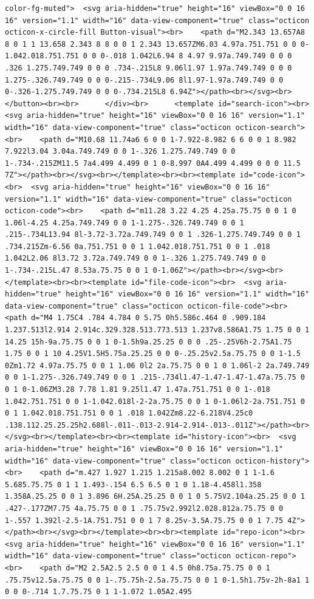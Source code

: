 \documentclass[
  letterpaper,
]{book}
\begin{document}
\begin{verbatim}
color-fg-muted">  <svg aria-hidden="true" height="16" viewBox="0 0 16 16" version="1.1" width="16" data-view-component="true" class="octicon octicon-x-circle-fill Button-visual"><br>    <path d="M2.343 13.657A8 8 0 1 1 13.658 2.343 8 8 0 0 1 2.343 13.657ZM6.03 4.97a.751.751 0 0 0-1.042.018.751.751 0 0 0-.018 1.042L6.94 8 4.97 9.97a.749.749 0 0 0 .326 1.275.749.749 0 0 0 .734-.215L8 9.06l1.97 1.97a.749.749 0 0 0 1.275-.326.749.749 0 0 0-.215-.734L9.06 8l1.97-1.97a.749.749 0 0 0-.326-1.275.749.749 0 0 0-.734.215L8 6.94Z"></path><br></svg><br></button><br><br>      </div><br>      <template id="search-icon"><br>  <svg aria-hidden="true" height="16" viewBox="0 0 16 16" version="1.1" width="16" data-view-component="true" class="octicon octicon-search"><br>    <path d="M10.68 11.74a6 6 0 0 1-7.922-8.982 6 6 0 0 1 8.982 7.922l3.04 3.04a.749.749 0 0 1-.326 1.275.749.749 0 0 1-.734-.215ZM11.5 7a4.499 4.499 0 1 0-8.997 0A4.499 4.499 0 0 0 11.5 7Z"></path><br></svg><br></template><br><br><template id="code-icon"><br>  <svg aria-hidden="true" height="16" viewBox="0 0 16 16" version="1.1" width="16" data-view-component="true" class="octicon octicon-code"><br>    <path d="m11.28 3.22 4.25 4.25a.75.75 0 0 1 0 1.06l-4.25 4.25a.749.749 0 0 1-1.275-.326.749.749 0 0 1 .215-.734L13.94 8l-3.72-3.72a.749.749 0 0 1 .326-1.275.749.749 0 0 1 .734.215Zm-6.56 0a.751.751 0 0 1 1.042.018.751.751 0 0 1 .018 1.042L2.06 8l3.72 3.72a.749.749 0 0 1-.326 1.275.749.749 0 0 1-.734-.215L.47 8.53a.75.75 0 0 1 0-1.06Z"></path><br></svg><br></template><br><br><template id="file-code-icon"><br>  <svg aria-hidden="true" height="16" viewBox="0 0 16 16" version="1.1" width="16" data-view-component="true" class="octicon octicon-file-code"><br>    <path d="M4 1.75C4 .784 4.784 0 5.75 0h5.586c.464 0 .909.184 1.237.513l2.914 2.914c.329.328.513.773.513 1.237v8.586A1.75 1.75 0 0 1 14.25 15h-9a.75.75 0 0 1 0-1.5h9a.25.25 0 0 0 .25-.25V6h-2.75A1.75 1.75 0 0 1 10 4.25V1.5H5.75a.25.25 0 0 0-.25.25v2.5a.75.75 0 0 1-1.5 0Zm1.72 4.97a.75.75 0 0 1 1.06 0l2 2a.75.75 0 0 1 0 1.06l-2 2a.749.749 0 0 1-1.275-.326.749.749 0 0 1 .215-.734l1.47-1.47-1.47-1.47a.75.75 0 0 1 0-1.06ZM3.28 7.78 1.81 9.25l1.47 1.47a.751.751 0 0 1-.018 1.042.751.751 0 0 1-1.042.018l-2-2a.75.75 0 0 1 0-1.06l2-2a.751.751 0 0 1 1.042.018.751.751 0 0 1 .018 1.042Zm8.22-6.218V4.25c0 .138.112.25.25.25h2.688l-.011-.013-2.914-2.914-.013-.011Z"></path><br></svg><br></template><br><br><template id="history-icon"><br>  <svg aria-hidden="true" height="16" viewBox="0 0 16 16" version="1.1" width="16" data-view-component="true" class="octicon octicon-history"><br>    <path d="m.427 1.927 1.215 1.215a8.002 8.002 0 1 1-1.6 5.685.75.75 0 1 1 1.493-.154 6.5 6.5 0 1 0 1.18-4.458l1.358 1.358A.25.25 0 0 1 3.896 6H.25A.25.25 0 0 1 0 5.75V2.104a.25.25 0 0 1 .427-.177ZM7.75 4a.75.75 0 0 1 .75.75v2.992l2.028.812a.75.75 0 0 1-.557 1.392l-2.5-1A.751.751 0 0 1 7 8.25v-3.5A.75.75 0 0 1 7.75 4Z"></path><br></svg><br></template><br><br><template id="repo-icon"><br>  <svg aria-hidden="true" height="16" viewBox="0 0 16 16" version="1.1" width="16" data-view-component="true" class="octicon octicon-repo"><br>    <path d="M2 2.5A2.5 2.5 0 0 1 4.5 0h8.75a.75.75 0 0 1 .75.75v12.5a.75.75 0 0 1-.75.75h-2.5a.75.75 0 0 1 0-1.5h1.75v-2h-8a1 1 0 0 0-.714 1.7.75.75 0 1 1-1.072 1.05A2.495 
\end{verbatim}
\end{document}
